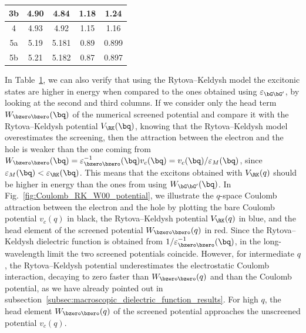 \begin{table}[ht]
\begin{tabular}{|c|c|c||c|c|}
        3b                            & 4.90                    & 4.84                                   & 1.18                    & 1.24 \\ \hline
        4                             & 4.93                    & 4.92                                   & 1.15                    & 1.16 \\ \hline
        5a                            & 5.19                    & 5.181                                  & 0.89                    & 0.899 \\
        5b                            & 5.21                    & 5.182                                  & 0.87                    & 0.897 \\ \hline
    \end{tabular}
    \label{tab:hBN_DFT_HSE_06_exciton_spectrum}
\end{table}

In Table~\ref{tab:hBN_DFT_HSE_06_exciton_spectrum}, we can also verify that using the Rytova--Keldysh model the excitonic states are higher in energy when compared to the ones obtained using $\varepsilon_{\bG \bG'}$, by looking at the second and third columns.
If we consider only the
head term $W_{\bzero \bzero} (\bq)$ of the numerical screened potential and compare it with the Rytova--Keldysh potential $V_{\RK} (\bq)$, knowing that the Rytova--Keldysh model overestimates the screening, then the attraction between the electron and the hole is weaker than the one coming from $W_{\bzero \bzero} (\bq) = \varepsilon^{-1}_{\bzero \bzero} (\bq) v_c(\bq) = v_c(\bq)/\varepsilon_M (\bq)$, since $\varepsilon_M (\bq) < \varepsilon_{\RK} (\bq)$.
This means that the excitons obtained with $V_{\RK} (q)$ should be higher in energy than the ones from using $W_{\bG \bG'}(\bq)$.
In Fig.~\ref{fig:Coulomb_RK_W00_potential}, we illustrate the $q$-space Coulomb attraction between the electron and the hole by plotting the bare Coulomb potential $v_c(q)$ in black, the Rytova--Keldysh potential $V_{\RK} (q)$ in blue, and the head element of the screened potential $W_{\bzero \bzero} (q)$ in red.
Since the Rytova--Keldysh dielectric function is obtained from $1/\varepsilon^{-1}_{\bzero \bzero} (\bq)$, in the long-wavelength limit the two screened potentials coincide.
However, for intermediate $q$, the Rytova--Keldysh potential underestimates the electrostatic Coulomb interaction, decaying to zero faster than $W_{\bzero \bzero} (q)$ and than the Coulomb potential, as we have already pointed out in subsection~\ref{subsec:macroscopic_dielectric_function_results}.
For high $q$, the head element $W_{\bzero \bzero} (q)$ of the screened potential approaches the unscreened potential $v_c(q)$.


